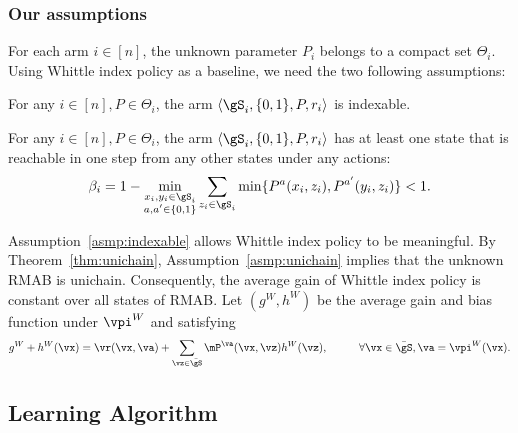 \subsubsection{Our assumptions}

For each arm $i\in[n]$, the unknown parameter $P_i$ belongs to a compact set $\Theta_i$.
Using Whittle index policy as a baseline, we need the two following assumptions:
\begin{asmp}
    \label{asmp:indexable}
    For any $i\in[n], P\in\Theta_i$, the arm $\langle\gS_i,\{0,1\},P,r_i\rangle$ is indexable.
\end{asmp}
\begin{asmp}
    \label{asmp:unichain}
    For any $i\in[n], P\in\Theta_i$, the arm $\langle\gS_i,\{0,1\},P,r_i\rangle$ has at least one state that is reachable in one step from any other states under any actions:
    \begin{align*}
        \beta_i = 1-\min_{\substack{x_i,y_i\in\gS_i \\a,a'\in\{0,1\}}} \sum_{z_i\in\gS_i} \min\{P^{a}(x_i,z_i), P^{a'}(y_i,z_i)\}<1.
    \end{align*}
\end{asmp}

Assumption~\ref{asmp:indexable} allows Whittle index policy to be meaningful.
By Theorem~\ref{thm:unichain}, Assumption~\ref{asmp:unichain} implies that the unknown RMAB is unichain. Consequently, the average gain of Whittle index policy is constant over all states of RMAB.
Let $(g^W, h^W)$ be the average gain and bias function under $\vpi^W$ and satisfying
\begin{align}
    g^W + h^W(\vx) = \vr(\vx,\va) +\sum_{\vz\in\bar{\gS}} \mP^{\va}(\vx, \vz)h^W(\vz),\hspace{1cm} \forall \vx\in\bar{\gS}, \va=\vpi^W(\vx). \label{eq:bellman}
\end{align}

\subsection{Learning Algorithm}
\label{ssec:learn_algo}


